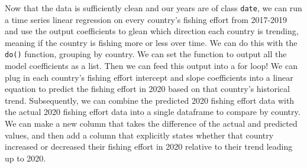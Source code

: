 \documentclass[
]{article}
\newenvironment{Shaded}{\begin{snugshade}}{\end{snugshade}}
\newcommand{\AttributeTok}[1]{\textcolor[rgb]{0.77,0.63,0.00}{#1}}
\newcommand{\CommentTok}[1]{\textcolor[rgb]{0.56,0.35,0.01}{\textit{#1}}}
\newcommand{\ConstantTok}[1]{\textcolor[rgb]{0.00,0.00,0.00}{#1}}
\newcommand{\ControlFlowTok}[1]{\textcolor[rgb]{0.13,0.29,0.53}{\textbf{#1}}}
\newcommand{\FunctionTok}[1]{\textcolor[rgb]{0.00,0.00,0.00}{#1}}
\newcommand{\NormalTok}[1]{#1}
\newcommand{\OtherTok}[1]{\textcolor[rgb]{0.56,0.35,0.01}{#1}}
\newcommand{\SpecialCharTok}[1]{\textcolor[rgb]{0.00,0.00,0.00}{#1}}
\begin{document}
Now that the data is sufficiently clean and our years are of class
\texttt{date}, we can run a time series linear regression on every
country's fishing effort from 2017-2019 and use the output coefficients
to glean which direction each country is trending, meaning if the
country is fishing more or less over time. We can do this with the
\texttt{do()} function, grouping by country. We can set the function to
output all the model coefficients as a list. Then we can feed this
output into a for loop! We can plug in each country's fishing effort
intercept and slope coefficients into a linear equation to predict the
fishing effort in 2020 based on that country's historical trend.
Subsequently, we can combine the predicted 2020 fishing effort data with
the actual 2020 fishing effort data into a single dataframe to compare
by country. We can make a new column that takes the difference of the
actual and predicted values, and then add a column that explicitly
states whether that country increased or decreased their fishing effort
in 2020 relative to their trend leading up to 2020.

\begin{Shaded}
\end{Shaded}
\end{document}
